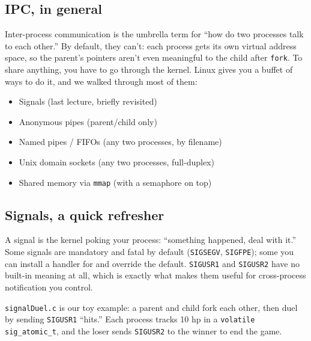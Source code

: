 \documentclass[11pt]{article}
\begin{document}
\subsection*{IPC, in general}

Inter-process communication is the umbrella term for ``how do two
processes talk to each other.'' By default, they can't: each process
gets its own virtual address space, so the parent's pointers aren't
even meaningful to the child after \texttt{fork}. To share anything,
you have to go through the kernel. Linux gives you a buffet of ways
to do it, and we walked through most of them:
\begin{itemize}
  \item Signals (last lecture, briefly revisited)
  \item Anonymous pipes (parent/child only)
  \item Named pipes / FIFOs (any two processes, by filename)
  \item Unix domain sockets (any two processes, full-duplex)
  \item Shared memory via \texttt{mmap} (with a semaphore on top)
\end{itemize}

\subsection*{Signals, a quick refresher}

A signal is the kernel poking your process: ``something happened,
deal with it.'' Some signals are mandatory and fatal by default
(\texttt{SIGSEGV}, \texttt{SIGFPE}); some you can install a handler
for and override the default. \texttt{SIGUSR1} and \texttt{SIGUSR2}
have no built-in meaning at all, which is exactly what makes them
useful for cross-process notification you control.

\texttt{signalDuel.c} is our toy example: a parent and child fork
each other, then duel by sending \texttt{SIGUSR1} ``hits.'' Each
process tracks 10 hp in a \texttt{volatile sig\_atomic\_t}, and the
loser sends \texttt{SIGUSR2} to the winner to end the game.
\end{document}
